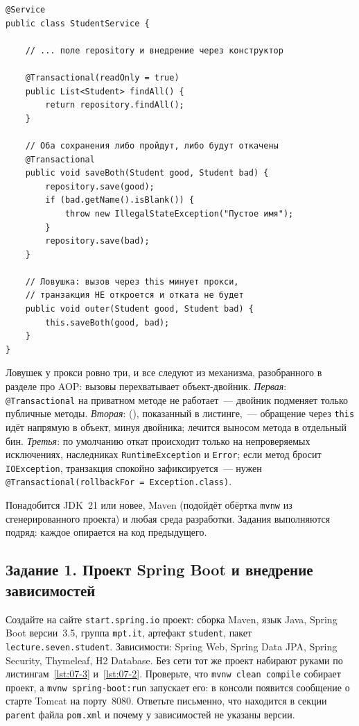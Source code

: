 \begin{listing}[H]
\begin{verbatim}
@Service
public class StudentService {

    // ... поле repository и внедрение через конструктор

    @Transactional(readOnly = true)
    public List<Student> findAll() {
        return repository.findAll();
    }

    // Оба сохранения либо пройдут, либо будут откачены
    @Transactional
    public void saveBoth(Student good, Student bad) {
        repository.save(good);
        if (bad.getName().isBlank()) {
            throw new IllegalStateException("Пустое имя");
        }
        repository.save(bad);
    }

    // Ловушка: вызов через this минует прокси,
    // транзакция НЕ откроется и отката не будет
    public void outer(Student good, Student bad) {
        this.saveBoth(good, bad);
    }
}
\end{verbatim}
\caption{Транзакции на сервисном слое и ловушка самовызова}
\label{lst:07-15}
\end{listing}

Ловушек у прокси ровно три, и все следуют из механизма, разобранного в разделе
про AOP: вызовы перехватывает объект-двойник. \emph{Первая}:
\texttt{@Transactional} на приватном методе не работает~--- двойник подменяет
только публичные методы. \emph{Вторая}: 
(), показанный в листинге,~--- обращение через
\texttt{this} идёт напрямую в объект, минуя двойника; лечится выносом метода в
отдельный бин. \emph{Третья}: по умолчанию откат происходит только на
непроверяемых исключениях, наследниках \texttt{RuntimeException} и
\texttt{Error}; если метод бросит \texttt{IOException}, транзакция спокойно
зафиксируется~--- нужен \texttt{@Transactional(rollbackFor = Exception.class)}.

\praktikum{}

Понадобится JDK~21 или новее, Maven (подойдёт обёртка
\texttt{mvnw} из сгенерированного проекта) и любая среда разработки. Задания
выполняются подряд: каждое опирается на код предыдущего.

\subsection*{Задание 1. Проект Spring Boot и внедрение зависимостей}

Создайте на сайте \texttt{start.spring.io} проект: сборка Maven, язык Java,
Spring Boot версии~3.5, группа \texttt{mpt.it}, артефакт \texttt{student},
пакет
\texttt{lecture.seven.student}. Зависимости: Spring Web, Spring Data JPA,
Spring Security, Thymeleaf, H2 Database. Без сети тот же проект набирают
руками по листингам~\ref{lst:07-3} и~\ref{lst:07-2}. Проверьте, что
\texttt{mvnw clean compile} собирает проект, а \texttt{mvnw spring-boot:run}
запускает его: в консоли появится сообщение о старте Tomcat на порту~8080. Ответьте письменно, что находится в секции \texttt{parent} файла
\texttt{pom.xml} и почему у зависимостей не указаны версии.


